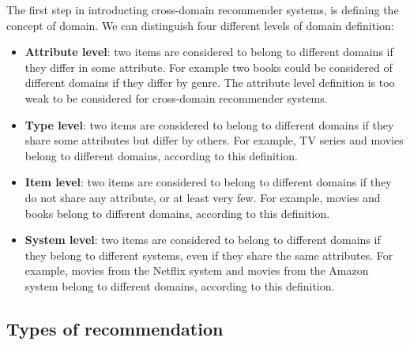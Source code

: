 The first step in introducting cross-domain recommender systems, is defining the concept of domain. We can distinguish four different levels of domain definition:
\begin{itemize}
\item \textbf{Attribute level}: two items are considered to belong to different domains if they differ in some attribute. For example two books could be considered of different domains if they differ by genre. The attribute level definition is too weak to be considered for cross-domain recommender systems.
\item \textbf{Type level}: two items are considered to belong to different domains if they share some attributes but differ by others. For example, TV series and movies belong to different domains, according to this definition.
\item \textbf{Item level}: two items are considered to belong to different domains if they do not share any attribute, or at least very few. For example, movies and books belong to different domains, according to this definition.
\item \textbf{System level}: two items are considered to belong to different domains if they belong to different systems, even if they share the same attributes. For example, movies from the Netflix system and movies from the Amazon system belong to different domains, according to this definition.
\end{itemize}


\subsection{Types of recommendation}

